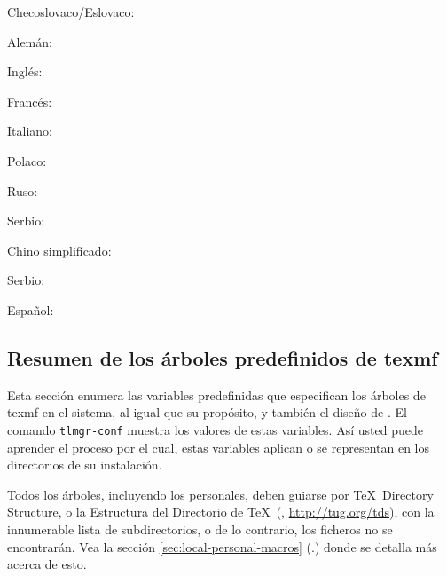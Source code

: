 \documentclass{article}
\begin{document}
\begin{itemize*}
\item{Checoslovaco/Eslovaco:} 
\item{Alemán:} 
\item{Inglés:} 
\item{Francés:} 
\item{Italiano:} 
\item{Polaco:} 
\item{Ruso:} 
\item{Serbio:} 
\item{Chino simplificado:} 
\item{Serbio:} 
\item{Español:} 
\end{itemize*}

\subsection{Resumen de los árboles predefinidos de texmf}
\label{sec:texmftrees}

Esta sección enumera las variables predefinidas que especifican los
árboles de texmf en el sistema, al igual que su propósito, y también
el diseño de \TL{}. El comando \texttt{tlmgr-conf} muestra los valores
de estas variables. Así usted puede aprender el proceso por el cual,
estas variables aplican o se representan en los directorios de su
instalación.

Todos los árboles, incluyendo los personales, deben guiarse por \TeX\
Directory Structure, o la Estructura del Directorio de \TeX\ (\TDS,
\url{http://tug.org/tds}), con la innumerable lista de
subdirectorios, o de lo contrario, los ficheros no se encontrarán. Vea
la sección \ref{sec:local-personal-macros}
(\p.\pageref{sec:local-personal-macros}) donde se detalla más acerca
de esto.
\end{document}
